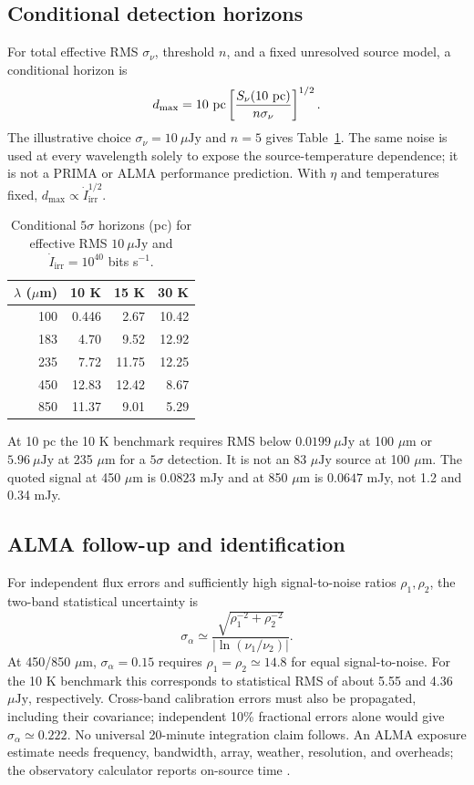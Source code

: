 \documentclass[10pt,twocolumn]{article}
\newcommand{\Iirr}{\dot I_{\mathrm{irr}}}
\newcommand{\ujy}{\mu\mathrm{Jy}}
\begin{document}
\subsection{Conditional detection horizons}
For total effective RMS $\sigma_\nu$, threshold $n$, and a fixed
unresolved source model, a conditional horizon is
\begin{equation}
d_{\max}=10\ {\rm pc}
\left[\frac{S_\nu(10\ {\rm pc})}{n\sigma_\nu}\right]^{1/2}.
\label{eq:horizon}
\end{equation}
The illustrative choice $\sigma_\nu=10\ \ujy$ and $n=5$ gives
Table~\ref{tab:horizon}. The same noise is used at every wavelength
solely to expose the source-temperature dependence; it is not a
PRIMA or ALMA performance prediction. With $\eta$ and temperatures
fixed, $d_{\max}\propto\Iirr^{1/2}$.

\begin{table}[ht]
\centering
\caption{Conditional $5\sigma$ horizons (pc) for effective RMS
$10\ \ujy$ and $\Iirr=10^{40}$ bits s$^{-1}$.}
\begin{tabular}{rrrr}
\toprule
$\lambda$ ($\mu$m) & 10 K & 15 K & 30 K\\
\midrule
100 & 0.446 & 2.67 & 10.42\\
183 & 4.70 & 9.52 & 12.92\\
235 & 7.72 & 11.75 & 12.25\\
450 & 12.83 & 12.42 & 8.67\\
850 & 11.37 & 9.01 & 5.29\\
\bottomrule
\end{tabular}
\label{tab:horizon}
\end{table}

At 10 pc the 10 K benchmark requires RMS below
$0.0199\ \ujy$ at 100 $\mu$m or $5.96\ \ujy$ at
235 $\mu$m for a $5\sigma$ detection. It is not an
83 $\ujy$ source at 100 $\mu$m. The quoted signal at
450 $\mu$m is $0.0823$ mJy and at 850 $\mu$m is
$0.0647$ mJy, not 1.2 and 0.34 mJy.

\subsection{ALMA follow-up and identification}
For independent flux errors and sufficiently high signal-to-noise ratios
$\rho_1,\rho_2$, the two-band statistical uncertainty is
\begin{equation}
\sigma_\alpha\simeq
\frac{\sqrt{\rho_1^{-2}+\rho_2^{-2}}}{|\ln(\nu_1/\nu_2)|}.
\label{eq:alphaerror}
\end{equation}
At 450/850 $\mu$m, $\sigma_\alpha=0.15$ requires
$\rho_1=\rho_2\simeq14.8$ for equal signal-to-noise. For the
10 K benchmark this corresponds to statistical RMS of about
5.55 and 4.36 $\ujy$, respectively. Cross-band calibration errors
must also be propagated, including their covariance; independent
10\% fractional errors alone would give $\sigma_\alpha\simeq0.222$.
No universal 20-minute integration claim follows. An ALMA exposure
estimate needs frequency, bandwidth, array, weather, resolution, and
overheads; the observatory calculator reports on-source time
\cite{ALMAcalculator}.
\end{document}

